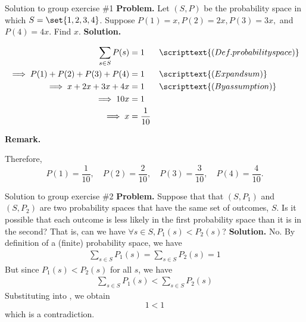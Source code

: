 \documentclass[10pt]{beamer}
\begin{document}
\begin{frame}{Solution to group exercise \#1}
\textbf{Problem.} Let $(S,P)$ be the probability space in which $S=\set{1,2,3,4}$. Suppose $P(1) =x, P(2) = 2x, P(3) = 3x,$ and  $P(4)=4x$.  Find $x$.
\vfill 
\textbf{Solution.} 

\begin{align*}
\sum_{s \in S} P(s) &= 1 && \scripttext{(Def. probability space)} \\
\implies P(1) + P(2) + P(3) + P(4) &=1	 && \scripttext{(Expand sum)} \\
\implies x + 2x + 3x + 4x &=1	 && \scripttext{(By assumption)} \\
\implies 10x &=1	 \\
\implies x &= \frac{1}{10}
\end{align*}

\vfill 
\textbf{Remark.} 

Therefore,
\[ P(1) = \frac{1}{10}, \quad  P(2) = \frac{2}{10}, \quad  P(3) = \frac{3}{10}, \quad  P(4) = \frac{4}{10}.\]



\end{frame}


\begin{frame}{Solution to group exercise \#2}
\textbf{Problem.}  Suppose that that $(S,P_1)$  and $(S,P_2)$ are two probability spaces that have the same set of outcomes, $S$.   Is it possible that each outcome is less likely in the first probability space than it is in the second?  That is, can we have $\forall s \in S, P_1(s) < P_2(s)$?
\vfill 
\textbf{Solution.}
No. By definition of a (finite) probability space, we have
%
\begin{align}
\sum_{s \in S} P_1(s) = \sum_{s \in S} P_2(s) = 1 
\label{eqn:prob_space_sums_to_one} 
\end{align}
%
But since $P_1(s) < P_2(s)$ for all $s$, we have
\begin{align}
\sum_{s \in S} P_1(s) < \sum_{s \in S} P_2(s) 
\label{eqn:P2_dominates_P1} 
\end{align}
Substituting   into  , we obtain
\[ 1 < 1 \]
which is a contradiction.

   
\end{frame}
\end{document}
